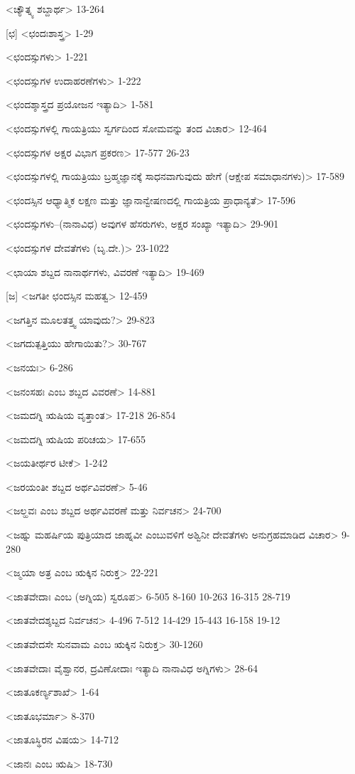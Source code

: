 <ಚ್ಯೌತ್ನ್ಯ ಶಬ್ದಾರ್ಥ>
13-264

[ಛ]
<ಛಂದಃಶಾಸ್ತ್ರ>
1-29

<ಛಂದಸ್ಸುಗಳು>
1-221

<ಛಂದಸ್ಸುಗಳ ಉದಾಹರಣೆಗಳು>
1-222

<ಛಂದಶ್ಶಾಸ್ತ್ರದ ಪ್ರಯೋಜನ ಇತ್ಯಾದಿ>
1-581

<ಛಂದಸ್ಸುಗಳಲ್ಲಿ ಗಾಯತ್ರಿಯು ಸ್ವರ್ಗದಿಂದ ಸೋಮವನ್ನು ತಂದ ವಿಚಾರ>
12-464

<ಛಂದಸ್ಸುಗಳ ಅಕ್ಷರ ವಿಭಾಗ ಪ್ರಕರಣ>
17-577
26-23

<ಛಂದಸ್ಸುಗಳಲ್ಲಿ ಗಾಯತ್ರಿಯು ಬ್ರಹ್ಮಜ್ಞಾನಕ್ಕೆ ಸಾಧನವಾಗುವುದು ಹೇಗೆ (ಆಕ್ಷೇಪ ಸಮಾಧಾನಗಳು)>
17-589

<ಛಂದಸ್ಸಿನ ಆಧ್ಯಾತ್ಮಿಕ ಲಕ್ಷಣ ಮತ್ತು ಜ್ಞಾನಾನ್ವೇಷಣದಲ್ಲಿ ಗಾಯತ್ರಿಯ ಪ್ರಾಧಾನ್ಯತೆ>
17-596

<ಛಂದಸ್ಸುಗಳು–(ನಾನಾವಿಧ) ಅವುಗಳ ಹೆಸರುಗಳು, ಅಕ್ಷರ ಸಂಖ್ಯಾ ಇತ್ಯಾದಿ>
29-901

<ಛಂದಸ್ಸುಗಳ ದೇವತೆಗಳು (ಬೃ.ದೇ.)>
23-1022

<ಛಾಯಾ ಶಬ್ದದ ನಾನಾರ್ಥಗಳು, ವಿವರಣೆ ಇತ್ಯಾದಿ>
19-469

[ಜ]
<ಜಗತೀ ಛಂದಸ್ಸಿನ ಮಹತ್ವ>
12-459

<ಜಗತ್ತಿನ ಮೂಲತತ್ತ್ವ ಯಾವುದು?>
29-823

<ಜಗದುತ್ಪತ್ತಿಯು ಹೇಗಾಯಿತು?>
30-767

<ಜನಯಃ>
6-286

<ಜನಂಸಹಃ ಎಂಬ ಶಬ್ದದ ವಿವರಣೆ>
14-881

<ಜಮದಗ್ನಿ ಋಷಿಯ ವೃತ್ತಾಂತ>
17-218
26-854

<ಜಮದಗ್ನಿ ಋಷಿಯ ಪರಿಚಯ>
17-655

<ಜಯತೀರ್ಥರ ಟೀಕೆ>
1-242

<ಜರಯಂತೀ ಶಬ್ದದ ಅರ್ಥವಿವರಣೆ>
5-46

<ಜಲ್ಹವಃ ಎಂಬ ಶಬ್ದದ ಅರ್ಥವಿವರಣೆ ಮತ್ತು ನಿರ್ವಚನ>
24-700

<ಜಹ್ನು ಮಹರ್ಷಿಯ ಪುತ್ರಿಯಾದ ಜಾಹ್ನವೀ ಎಂಬುವಳಿಗೆ ಅಶ್ವಿನೀ ದೇವತೆಗಳು ಅನುಗ್ರಹಮಾಡಿದ ವಿಚಾರ>
9-280

<ಜ್ಮಯಾ ಅತ್ರ ಎಂಬ ಋಕ್ಕಿನ ನಿರುಕ್ತ>
22-221

<ಜಾತವೇದಾಃ ಎಂಬ (ಅಗ್ನಿಯ) ಸ್ವರೂಪ>
6-505 
8-160 
10-263 
16-315
28-719

<ಜಾತವೇದಶ್ಶಬ್ದದ ನಿರ್ವಚನ>
4-496 
7-512 
14-429 
15-443 
16-158
19-12

<ಜಾತವೇದಸೇ ಸುನವಾಮ ಎಂಬ ಋಕ್ಕಿನ ನಿರುಕ್ತ>
30-1260

<ಜಾತವೇದಾಃ ವೈಶ್ವಾನರ, ದ್ರವಿಣೋದಾಃ ಇತ್ಯಾದಿ ನಾನಾವಿಧ ಅಗ್ನಿಗಳು>
28-64

<ಜಾತೂಕರ್ಣ್ಯಶಾಖೆ>
1-64

<ಜಾತೂಭರ್ಮಾ>
8-370

<ಜಾತೂಸ್ಥಿರನ ವಿಷಯ>
14-712

<ಜಾನಃ ಎಂಬ ಋಷಿ>
18-730

